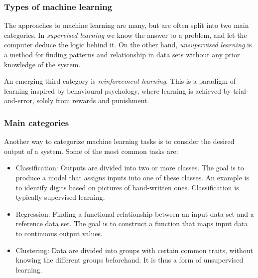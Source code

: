 \documentclass{beamer}
\begin{document}
\begin{frame}
\frametitle{Types of machine learning}

\begin{block}{}
The approaches to machine learning are many, but are often split into two main categories. 
In \emph{supervised learning} we know the answer to a problem,
and let the computer deduce the logic behind it. On the other hand, \emph{unsupervised learning}
is a method for finding patterns and relationship in data sets without any prior knowledge of the system.

An emerging  third category is  \emph{reinforcement learning}. This is a paradigm 
of learning inspired by behavioural psychology, where learning is achieved by trial-and-error, 
solely from rewards and punishment.
\end{block}
\end{frame}

\begin{frame}
\frametitle{Main categories}

\begin{block}{}
Another way to categorize machine learning tasks is to consider the desired output of a system.
Some of the most common tasks are:

\begin{itemize}
  \item Classification: Outputs are divided into two or more classes. The goal is to   produce a model that assigns inputs into one of these classes. An example is to identify  digits based on pictures of hand-written ones. Classification is typically supervised learning.

  \item Regression: Finding a functional relationship between an input data set and a reference data set.   The goal is to construct a function that maps input data to continuous output values.

  \item Clustering: Data are divided into groups with certain common traits, without knowing the different groups beforehand.  It is thus a form of unsupervised learning.
\end{itemize}

\noindent
\end{block}
\end{frame}
\end{document}
